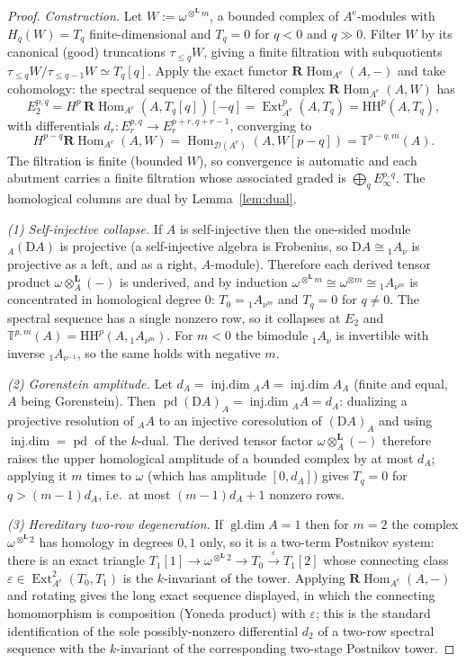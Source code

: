 \documentclass[11pt]{amsart}
\theoremstyle{definition}
\newcommand{\T}{\mathbb{T}}
\newcommand{\HH}{\mathrm{HH}}
\newcommand{\D}{\mathrm{D}}
\newcommand{\Ext}{\operatorname{Ext}}
\newcommand{\Hom}{\operatorname{Hom}}
\newcommand{\rHom}{\mathbf{R}\!\operatorname{Hom}}
\newcommand{\gl}{\operatorname{gl.dim}}
\newcommand{\pd}{\operatorname{pd}}
\newcommand{\Ae}{A^{\mathrm{e}}}
\newcommand{\der}{\mathcal{D}}
\newcommand{\Lotimes}{\otimes^{\mathbf{L}}}
\newcommand{\kk}{k}
\begin{document}
\begin{proof}
\emph{Construction.} Let $W:=\omega^{\Lotimes m}$, a bounded complex of
$\Ae$-modules with $H_q(W)=T_q$ finite-dimensional and $T_q=0$ for $q<0$ and
$q\gg0$. Filter $W$ by its canonical (good) truncations
$\tau_{\le q}W$, giving a finite filtration with subquotients
$\tau_{\le q}W/\tau_{\le q-1}W\simeq T_q[q]$. Apply the exact functor
$\rHom_{\Ae}(A,-)$ and take cohomology: the spectral sequence of the filtered
complex $\rHom_{\Ae}(A,W)$ has
\[
E_2^{p,q}=H^{p}\,\rHom_{\Ae}(A,T_q[q])[-q]
=\Ext^{p}_{\Ae}(A,T_q)=\HH^p(A,T_q),
\]
with differentials $d_r\colon E_r^{p,q}\to E_r^{p+r,q+r-1}$, converging to
\[
H^{p-q}\rHom_{\Ae}(A,W)=\Hom_{\der(\Ae)}(A,W[p-q])=\T^{p-q,m}(A).
\]
The
filtration is finite (bounded $W$), so convergence is automatic and each
abutment carries a finite filtration whose associated graded is
$\bigoplus_qE_\infty^{p,q}$. The homological columns are dual by
Lemma~\ref{lem:dual}.

\emph{(1) Self-injective collapse.} If $A$ is self-injective then the one-sided
module ${}_A(\D A)$ is projective (a self-injective algebra is Frobenius, so
$\D A\cong{}_1A_\nu$ is projective as a left, and as a right, $A$-module).
Therefore each derived tensor product $\omega\Lotimes_A(-)$ is underived, and
by induction $\omega^{\Lotimes m}\cong\omega^{\otimes m}\cong{}_1A_{\nu^m}$ is
concentrated in homological degree $0$: $T_0={}_1A_{\nu^m}$ and $T_q=0$ for
$q\ne0$. The spectral sequence has a single nonzero row, so it collapses at
$E_2$ and $\T^{p,m}(A)=\HH^p(A,{}_1A_{\nu^m})$. For $m<0$ the bimodule
${}_1A_\nu$ is invertible with inverse ${}_1A_{\nu^{-1}}$, so the same holds
with negative $m$.

\emph{(2) Gorenstein amplitude.} Let $d_A=\operatorname{inj.dim}{}_AA
=\operatorname{inj.dim}A_A$ (finite and equal, $A$ being Gorenstein). Then
$\pd(\D A)_A=\operatorname{inj.dim}{}_AA=d_A$: dualizing a projective
resolution of ${}_AA$ to an injective coresolution of $(\D A)_A$ and using
$\operatorname{inj.dim}=\pd$ of the $\kk$-dual. The derived tensor factor
$\omega\Lotimes_A(-)$ therefore raises the upper homological amplitude of a
bounded complex by at most $d_A$; applying it $m$ times to $\omega$ (which has
amplitude $[0,d_A]$) gives $T_q=0$ for $q>(m-1)d_A$, i.e.\ at most
$(m-1)d_A+1$ nonzero rows.

\emph{(3) Hereditary two-row degeneration.} If $\gl A=1$ then for $m=2$ the
complex $\omega^{\Lotimes2}$ has homology in degrees $0,1$ only, so it is a
two-term Postnikov system: there is an exact triangle
$T_1[1]\to\omega^{\Lotimes2}\to T_0\xrightarrow{\varepsilon}T_1[2]$ whose
connecting class $\varepsilon\in\Ext^2_{\Ae}(T_0,T_1)$ is the $k$-invariant of
the tower. Applying $\rHom_{\Ae}(A,-)$ and rotating gives the long exact
sequence displayed, in which the connecting homomorphism is composition
(Yoneda product) with $\varepsilon$; this is the standard identification of the
sole possibly-nonzero differential $d_2$ of a two-row spectral sequence with
the $k$-invariant of the corresponding two-stage Postnikov tower.
\end{proof}
\end{document}
